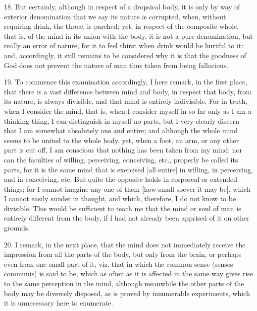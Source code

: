 18. But certainly, although in respect of a dropsical body, it is only by way of exterior denomination that we say its nature is corrupted, when, without requiring drink, the throat is parched; yet, in respect of the composite whole, that is, of the mind in its union with the body, it is not a pure denomination, but really an error of nature, for it to feel thirst when drink would be hurtful to it: and, accordingly, it still remains to be considered why it is that the goodness of God does not prevent the nature of man thus taken from being fallacious.

19. To commence this examination accordingly, I here remark, in the first place, that there is a vast difference between mind and body, in respect that body, from its nature, is always divisible, and that mind is entirely indivisible. For in truth, when I consider the mind, that is, when I consider myself in so far only as I am a thinking thing, I can distinguish in myself no parts, but I very clearly discern that I am somewhat absolutely one and entire; and although the whole mind seems to be united to the whole body, yet, when a foot, an arm, or any other part is cut off, I am conscious that nothing has been taken from my mind; nor can the faculties of willing, perceiving, conceiving, etc., properly be called its parts, for it is the same mind that is exercised [all entire] in willing, in perceiving, and in conceiving, etc. But quite the opposite holds in corporeal or extended things; for I cannot imagine any one of them [how small soever it may be], which I cannot easily sunder in thought, and which, therefore, I do not know to be divisible. This would be sufficient to teach me that the mind or soul of man is entirely different from the body, if I had not already been apprised of it on other grounds.

20. I remark, in the next place, that the mind does not immediately receive the impression from all the parts of the body, but only from the brain, or perhaps even from one small part of it, viz, that in which the common sense (senses communis) is said to be, which as often as it is affected in the same way gives rise to the same perception in the mind, although meanwhile the other parts of the body may be diversely disposed, as is proved by innumerable experiments, which it is unnecessary here to enumerate.

